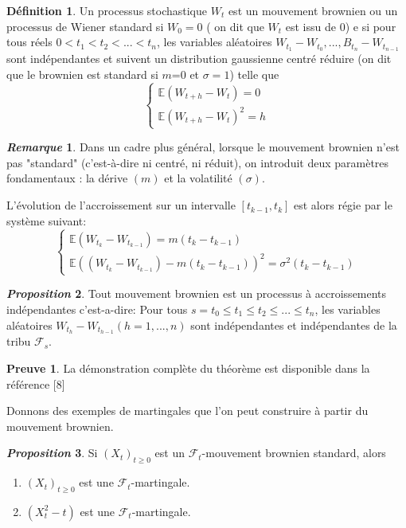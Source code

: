 \documentclass[12pt,a4paper,twoside]{book}%
\theoremstyle{definition}
\newtheorem{dfn}{Définition}[section]
\newtheorem*{pr}{\textbf{Preuve}}
\newtheorem{rem}{\textit{Remarque}}[section]
\newtheorem{prop}[dfn]{\textit{Proposition}}
\numberwithin{equation}{section}
\begin{document}
\begin{dfn}
	Un processus stochastique $W_t$ est un mouvement brownien ou un processus de Wiener standard si $W_0=0$ ( on dit que $W_t$ est issu de 0) e si pour tous réels $0<t_1<t_2<...<t_n$, les variables aléatoires $W_{t_1}-W_{t_0},...,B_{t_n}-W_{t_{n-1}}$ sont indépendantes et suivent un distribution gaussienne centré réduire (on dit que le brownien est standard si $m$=0 et $\sigma=1$) telle que 
	\[
	\begin{cases} 
		\mathbb{E}(W_{t+h} - W_t) = 0 \\ 
		\mathbb{E}(W_{t+h} - W_t)^2 = h 
	\end{cases}
	\]
\end{dfn}
\begin{rem}
Dans un cadre plus général, lorsque le mouvement brownien n'est pas "standard" (c'est-à-dire ni centré, ni réduit), on introduit deux paramètres fondamentaux : la dérive $(m)$ et la volatilité $(\sigma)$.

L'évolution de l'accroissement sur un intervalle $[t_{k-1},t_k]$ est alors régie par le système suivant:
\[
\begin{cases}
	\mathbb{E}(W_{t_k} - W_{t_{k-1}}) = m(t_k - t_{k-1}) \\
	\mathbb{E}\left((W_{t_k} - W_{t_{k-1}}) - m(t_k - t_{k-1})\right)^2 = \sigma^2(t_k - t_{k-1})
\end{cases}
\]
\end{rem}
\begin{prop}
	Tout mouvement brownien est un processus à accroissements indépendantes c'est-a-dire: Pour tous $s=t_0\leq t_1 \leq t_2 \leq ...\leq t_n$, les variables aléatoires $W_{t_h}-W_{t_{h-1}}(h=1,...,n)$ sont indépendantes et indépendantes de la tribu $\mathcal{F}_s$. 
\end{prop}
\begin{pr}
 La démonstration complète du théorème est disponible dans la référence [8]
\end{pr}
Donnons des exemples de martingales que l'on peut construire à partir du mouvement brownien.
\begin{prop}
	Si $(X_t)_{t\geq0}$ est un $\mathcal{F}_t$-mouvement brownien standard, alors
\begin{enumerate}
	\item $(X_t)_{t\geq0}$ est une $\mathcal{F}_t$-martingale.
	\item $(X_t^2-t)$ est une $\mathcal{F}_t$-martingale.
\end{enumerate}

\end{prop}
\end{document}
